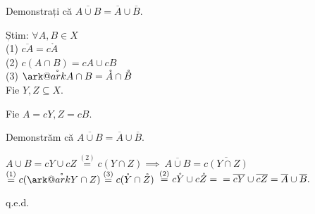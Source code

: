 \documentclass[11pt]{article}
\date{}
\title{}
\begin{document}
\makeatletter
{}
\newcommand{\ark@char}{{\usefont{U}{tipa}{m}{n}\symbol{62}}}%

\newcommand{\ark}[1]{\mathpalette\ark@ark{#1}}

\newcommand{\ark@ark}[2]{%
  \sbox0{$\m@th#1#2$}%
  \vbox{
    \hbox{\resizebox{\wd0}{\height}{\ark@char}}
    \nointerlineskip
    \box0
  }%
}
\makeatother

Demonstrați că $\overline{A \cup B} = \overline{A} \cup \overline{B}.$

\vspace{7pt}

Știm: $\forall A, B \in X$ \\
(1) $\overline{cA} = c\mathring{A}$ \\
(2) $c(A \cap B) = cA \cup cB$\\
(3) $\mathring{\ark{A \cap B}} = \mathring{A} \cap \mathring{B}$\\

Fie $Y, Z \subseteq X$.

Fie $A = cY, Z = cB$.

Demonstrăm că  $\overline{A \cup B} = \overline{A} \cup \overline{B}$.
\vspace{7pt}

$A \cup B = cY \cup cZ  \stackrel{(2)}{=} c(Y \cap Z) \implies\ \overline{ A \cup B } = \overline{ c(Y \cap Z) }$
$ \stackrel{(1)}{=} c(\mathring{\ark{ Y \cap Z }}) \stackrel{(3)}{=} c(\mathring{Y} \cap  \mathring{Z})$
$ \stackrel{(2)}{=} c\mathring{Y} \cup c\mathring{Z} = \\ = \overline{cY} \cup \overline{cZ} = \overline{A} \cup \overline{B}.$


q.e.d.
\end{document}
